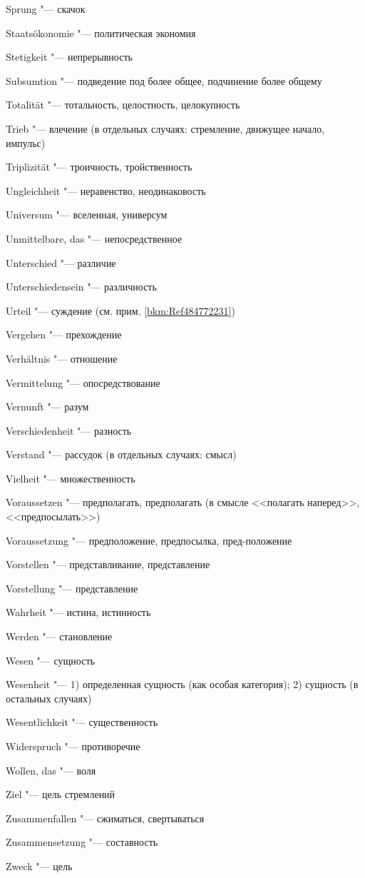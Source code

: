 \begin{multicols}{2}
Sprung "--- скачок

Staatsökonomie "--- политическая экономия

Stetigkeit "--- непрерывность

Subsumtion "--- подведение под более общее, подчинение более общему

\bigskip

Totalität "--- тотальность, целостность, целокупность

Trieb "--- влечение (в отдельных случаях: стремление, движущее
начало, импульс)

Triplizität "--- троичность, тройственность

\bigskip

Ungleichheit "--- неравенство, неодинаковость

Universum "--- вселенная, универсум

Unmittelbare, das "--- непосредственное

Unterschied "--- различие

Unterschiedensein "--- различность

Urteil "--- суждение (см. прим. \ref{bkm:Ref484772231})

\bigskip

Vergehen "--- прехождение

Verhältnis "--- отношение

Vermittelung "--- опосредствование

Vernunft "--- разум

Verschiedenheit "--- разность

Verstand "--- рассудок (в отдельных случаях: смысл)

Vielheit "--- множественность

Voraussetzen "--- предполагать, предполагать (в смысле <<полагать
наперед>>, <<предпосылать>>)

Voraussetzung "--- предположение, предпосылка, пред-положение

Vorstellen "--- представливание, представление

Vorstellung "--- представление

\bigskip

Wahrheit "--- истина, истинность

Werden "--- становление

Wesen "--- сущность

Wesenheit "--- 1) определенная сущность (как особая категория);
2) сущность (в остальных случаях)

Wesentlichkeit "--- существенность

Widerspruch "--- противоречие

Wollen, das "--- воля

\bigskip

Ziel "--- цель стремлений

Zusammenfallen "--- сжиматься, свертываться

Zusammensetzung "--- составность

Zweck "--- цель
\end{multicols}

